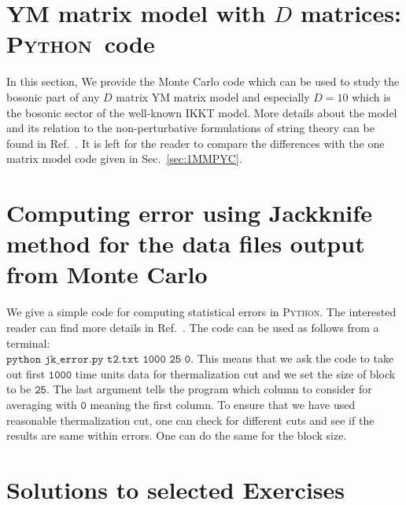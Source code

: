 \documentclass[11pt]{article}
\newcommand{\PY}{\textsc{Python}}
\begin{document}
\section{\label{sec:YMC}YM matrix model with $D$ matrices: \PY~code}

In this section, We provide the Monte Carlo code which can be used to study the bosonic part of any $D$ matrix YM matrix model and especially $D=10$ which is the bosonic sector of the well-known IKKT model. More details about the model and its relation to the non-perturbative formulations of string theory can be found in Ref.~\cite{Hotta:1998en}.
It is left for the reader to compare the differences with the one matrix model code given in Sec.~\ref{sec:1MMPYC}. 

\begin{footnotesize} 
	\begin{mdframed}[backgroundcolor=mauve!3] 
			
	\end{mdframed} 
\end{footnotesize}


\section{Computing error using Jackknife method for the data files output from Monte Carlo}

We give a simple code for computing statistical errors in \PY. The interested reader can find more details in Ref.~\cite{2012arXiv1210.3781Y}. The code can be used as follows from a terminal: \\ 
$\texttt{python jk\_error.py t2.txt 1000 25 0}$. This means that we ask the code to take out first $\texttt{1000}$ time units data for thermalization cut and we set the size of block to be $\texttt{25}$. The last argument tells the program which column to consider for averaging with $\texttt{0}$ meaning the first column. To ensure that we have used reasonable thermalization cut, one can check for different cuts and see if the results 
are same within errors. One can do the same for the block size. 

\begin{footnotesize} 
	\begin{mdframed}[backgroundcolor=mauve!3] 
			
	\end{mdframed} 
\end{footnotesize}

\section{\label{sec:solutions}Solutions to selected Exercises} 
\end{document}
